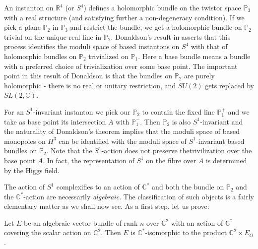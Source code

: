 An instanton on $\mathbb{R}^{4}$ (or $S^{4}$) defines a holomorphic
bundle on the twistor space $\mathbb{P}_{3}$ with a real structure
(and satisfying further a non-degeneracy condition). If we pick a
plane $\mathbb{P}_{2}$ in $\mathbb{P}_{3}$ and restrict the bundle, we
get a holomorphic bundle on $\mathbb{P}_{2}$ trivial on the unique
real line in $\mathbb{P}_{2}$. Donaldson's result in \cite{chap1-key4}
asserts that this process identifies the moduli space of based
instantons on $S^{4}$ with that of holomorphic bundles on
$\mathbb{P}_{2}$ trivialized on $\mathbb{P}_{1}$. Here a base bundle
means a bundle with a preferred choice of trivialization over some
base point. The important point in this result of Donaldson is that
the bundles on $\mathbb{P}_{2}$ are purely holomorphic - there is no
real or unitary restriction, and $SU(2)$ gets replaced by
$SL(2,\mathbb{C})$. 

For an $S^{1}$-invariant instanton we pick our $\mathbb{P}_{2}$ to
contain the fixed line $\mathbb{P}^{+}_{1}$ and we take as base point
its intersection $A$ with $\mathbb{P}^{-}_{1}$. Then $\mathbb{P}_{2}$
is also $S^{1}$-invariant and the naturality of Donaldson's theorem
implies that the moduli space of based monopoles on $H^{3}$ can be
identified with the moduli space of $S^{1}$-invariant based bundles on
$\mathbb{P}_{2}$. Note that the $S^{1}$-action does not preserve
the\pageoriginale trivilization over the base point $A$. In fact, the
representation of $S^{1}$ on the fibre over $A$ is determined by the
Higgs field.

The action of $S^{1}$ complexifies to an action of $\mathbb{C}^{*}$
and both the bundle on $\mathbb{P}_{2}$ and the
$\mathbb{C}^{*}$-action are necessarily {\em algebraic}. The
classification of such objects is a fairly elementary matter as we
shall now see. As a first step, let us prove:

\begin{lemma}\label{chap1-lem6.1}
Let $E$ be an algebraic vector bundle of rank $n$ over
$\mathbb{C}^{2}$ with an action of $\mathbb{C}^{*}$ covering the
scalar action on $\mathbb{C}^{2}$. Then $E$ is
$\mathbb{C}^{*}$-isomorphic to the product $\mathbb{C}^{2}\times
E_{O}$. 
\end{lemma}

